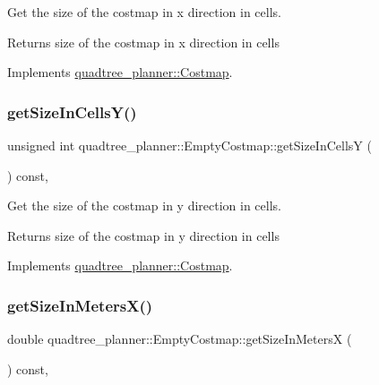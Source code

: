 Get the size of the costmap in x direction in cells. 

\begin{DoxyReturn}{Returns}
size of the costmap in x direction in cells 
\end{DoxyReturn}


Implements \hyperlink{classquadtree__planner_1_1Costmap_aa78086776637e7472d5ca8ae44f5c2f0}{quadtree\+\_\+planner\+::\+Costmap}.

\mbox{\label{classquadtree__planner_1_1EmptyCostmap_a2e3c5ddaaaee218d1cccf2a72dbe633f}} 
\subsubsection{\texorpdfstring{get\+Size\+In\+Cells\+Y()}{getSizeInCellsY()}}
{\footnotesize\ttfamily unsigned int quadtree\+\_\+planner\+::\+Empty\+Costmap\+::get\+Size\+In\+CellsY (\begin{DoxyParamCaption}{ }\end{DoxyParamCaption}) const\hspace{0.3cm}{\ttfamily [override]}, {\ttfamily [virtual]}}



Get the size of the costmap in y direction in cells. 

\begin{DoxyReturn}{Returns}
size of the costmap in y direction in cells 
\end{DoxyReturn}


Implements \hyperlink{classquadtree__planner_1_1Costmap_a5c07589004856b158dbbe38470562bfe}{quadtree\+\_\+planner\+::\+Costmap}.

\mbox{\label{classquadtree__planner_1_1EmptyCostmap_ae7bbb00b36630b65f3e5d5d55a519fdd}} 
\subsubsection{\texorpdfstring{get\+Size\+In\+Meters\+X()}{getSizeInMetersX()}}
{\footnotesize\ttfamily double quadtree\+\_\+planner\+::\+Empty\+Costmap\+::get\+Size\+In\+MetersX (\begin{DoxyParamCaption}{ }\end{DoxyParamCaption}) const\hspace{0.3cm}{\ttfamily [override]}, {\ttfamily [virtual]}}



